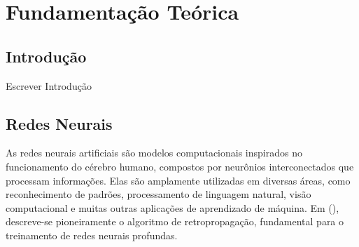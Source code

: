 \chapter{Fundamentação Teórica}

\section{Introdução}

Escrever Introdução

\section{Redes Neurais}
\label{sec:ewheelchair}

As redes neurais artificiais são modelos computacionais inspirados no funcionamento do cérebro humano, compostos por neurônios interconectados que processam informações. Elas são amplamente utilizadas em diversas áreas, como reconhecimento de padrões, processamento de linguagem natural, visão computacional e muitas outras aplicações de aprendizado de máquina. Em (\citeyear{rumelhart1986learning}), descreve-se pioneiramente o algoritmo de retropropagação, fundamental para o treinamento de redes neurais profundas.

